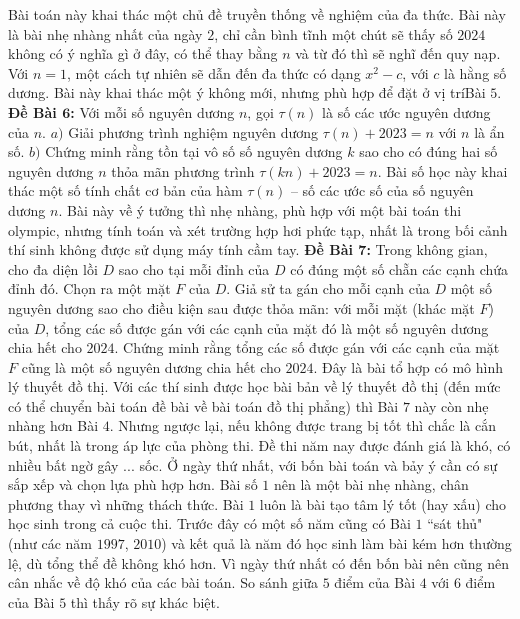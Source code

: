 \begin{multicols}{2}
	\vskip 0.1cm
	Bài toán này khai thác một chủ đề truyền thống về nghiệm của đa thức. Bài này là bài nhẹ nhàng nhất của ngày $2$, chỉ cần bình tĩnh một chút sẽ thấy số $2024$ không có ý nghĩa gì ở đây, có thể thay bằng $n$ và từ đó thì sẽ nghĩ đến quy nạp. Với $n = 1$, một cách tự nhiên sẽ dẫn đến đa thức có dạng $x^2 - c$, với $c$ là hằng số dương. Bài này khai thác một ý không mới, nhưng phù hợp để đặt ở vị trí\linebreak Bài $5$.
	\vskip 0.1cm  
	\textbf{\color{cackithi}Đề Bài $\pmb6$:} Với mỗi số nguyên dương $n$, gọi $\tau(n)$ là số các ước nguyên dương của $n$.
	\vskip 0.1cm
	$a)$ Giải phương trình nghiệm nguyên dương $\tau(n) + 2023 = n$ với $n$ là ẩn số.
	\vskip 0.1cm
	$b)$ Chứng minh rằng tồn tại vô số số nguyên dương $k$ sao cho có đúng hai số nguyên dương $n$ thỏa mãn phương trình $\tau(kn) + 2023 = n$. 
	\vskip 0.1cm
	Bài số học này khai thác một số tính chất cơ bản của hàm $\tau(n)$ -- số các ước số của số nguyên dương $n$. Bài này về ý tưởng thì nhẹ nhàng, phù hợp với một bài toán thi olympic, nhưng tính toán và xét trường hợp hơi phức tạp, nhất là trong bối cảnh thí sinh không được sử dụng máy tính cầm tay.
	\vskip 0.1cm 
	\textbf{\color{cackithi}Đề Bài $\pmb7$:} Trong không gian, cho đa diện lồi $D$ sao cho tại mỗi đỉnh của $D$ có đúng một số chẵn các cạnh chứa đỉnh đó. Chọn ra một mặt $F$ của $D$. Giả sử ta gán cho mỗi cạnh của $D$ một số nguyên dương sao cho điều kiện sau được thỏa mãn: với mỗi mặt (khác mặt $F$) của $D$, tổng các số được gán với các cạnh của mặt đó là một số nguyên dương chia hết cho $2024$. Chứng minh rằng tổng các số được gán với các cạnh của mặt $F$ cũng là một số nguyên dương chia hết cho $2024$.
	\vskip 0.1cm
	Đây là bài tổ hợp có mô hình lý thuyết đồ thị. Với các thí sinh được học bài bản về lý thuyết đồ thị (đến mức có thể chuyển bài toán đề bài về bài toán đồ thị phẳng) thì Bài $7$ này còn nhẹ nhàng hơn Bài $4$. Nhưng ngược lại, nếu không được trang bị tốt thì chắc là cắn bút, nhất là trong áp lực của phòng thi. 
	\vskip 0.1cm
	Đề thi năm nay được đánh giá là khó, có nhiều bất ngờ gây ... sốc. Ở ngày thứ nhất, với bốn bài toán và bảy ý cần có sự sắp xếp và chọn lựa phù hợp hơn. Bài số $1$ nên là một bài nhẹ nhàng, chân phương thay vì những thách thức. Bài $1$ luôn là bài tạo tâm lý tốt (hay xấu) cho học sinh trong cả cuộc thi. Trước đây có một số năm cũng có Bài $1$ ``sát thủ" (như các năm $1997$, $2010$) và kết quả là năm đó học sinh làm bài kém hơn thường lệ, dù tổng thể đề không khó hơn. Vì ngày thứ nhất có đến bốn bài nên cũng nên cân nhắc về độ khó của các bài toán. So sánh giữa $5$ điểm của Bài $4$ với $6$ điểm của Bài $5$ thì thấy rõ sự khác biệt.

\end{multicols}
